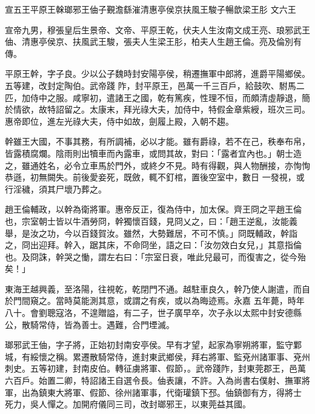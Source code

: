 
\begin{pinyinscope}

 宣五王平原王榦瑯邪王伷子覲澹繇漼清惠亭侯京扶風王駿子暢歆梁王肜
 文六王



 宣帝九男，穆張皇后生景帝、文帝、平原王乾，伏夫人生汝南文成王亮、琅邪武王伷、清惠亭侯京、扶風武王駿，張夫人生梁王肜，柏夫人生趙王倫。亮及倫別有傳。



 平原王幹，字子良。少以公子魏時封安陽亭侯，稍遷撫軍中郎將，進爵平陽鄉侯。五等建，改封定陶伯。武帝踐
 阼，封平原王，邑萬一千三百戶，給鼓吹、駙馬二匹，加侍中之服。咸寧初，遣諸王之國，乾有篤疾，性理不恒，而頗清虛靜退，簡於情欲，故特詔留之。太康末，拜光祿大夫，加侍中，特假金章紫綬，班次三司。惠帝即位，進左光祿大夫，侍中如故，劍履上殿，入朝不趨。



 幹雖王大國，不事其務，有所調補，必以才能。雖有爵祿，若不在己，秩奉布帛，皆露積腐爛。陰雨則出犢車而內露車，或問其故，對曰：「露者宜內也。」朝士造之，雖通姓名，必令立車馬於門外，或終夕不見。時有得觀，與人物酬接，亦恂恂恭遜，初無闕失。前後愛妾死，既斂，輒不釘棺，置後空室中，數日
 一發視，或行淫穢，須其尸壞乃葬之。



 趙王倫輔政，以幹為衛將軍。惠帝反正，復為侍中，加太保。齊王冏之平趙王倫也，宗室朝士皆以牛酒勞冏，幹獨懷百錢，見冏乂之，曰：「趙王逆亂，汝能義舉，是汝之功，今以百錢賀汝。雖然，大勢難居，不可不慎。」冏既輔政，幹詣之，冏出迎拜。幹入，踞其床，不命冏坐，語之曰：「汝勿效白女兒，」其意指倫也。及冏誅，幹哭之慟，謂左右曰：「宗室日衰，唯此兒最可，而復害之，從今殆矣！」



 東海王越興義，至洛陽，往視乾，乾閉門不通。越駐車良久，幹乃使人謝遣，而自於門間窺之。當時莫能測其意，或謂之有疾，或以為晦迹焉。永嘉
 五年薨，時年八十。會劉聰寇洛，不遑贈謚，有二子，世子廣早卒，次子永以太熙中封安德縣公，散騎常侍，皆為善士。遇難，合門堙滅。



 瑯邪武王伷，字子將，正始初封南安亭侯。早有才望，起家為寧朔將軍，監守鄴城，有綏懷之稱。累遷散騎常侍，進封東武鄉侯，拜右將軍、監兗州諸軍事、兗州刺史。五等初建，封南皮伯。轉征虜將軍、假節，。武帝踐阼，封東莞郡王，邑萬六百戶。始置二卿，特詔諸王自選令長。伷表讓，不許。入為尚書右僕射、撫軍將軍，出為鎮東大將軍、假節、徐州諸軍事，代衛瓘鎮下邳。伷鎮御有方，得將士
 死力，吳人憚之。加開府儀同三司，改封瑯邪王，以東莞益其國。




\end{pinyinscope}
